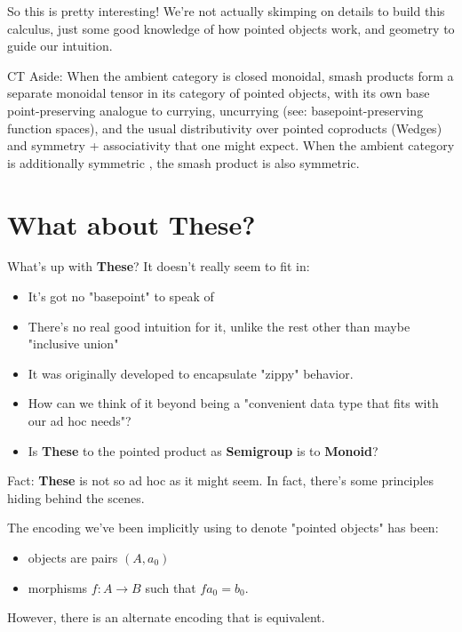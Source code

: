 \documentclass[tikz]{beamer}
\theoremstyle{definition}
\begin{document}
\frame
{
	So this is pretty interesting! We're not actually skimping on details to build this calculus, just some good knowledge of how pointed objects work, and geometry to guide our intuition.
}

\frame
{
	CT Aside: When the ambient category is closed monoidal, smash products form a separate monoidal tensor in its category of pointed objects, with its own base point-preserving analogue to currying, uncurrying (see: basepoint-preserving function spaces), and the usual distributivity over pointed coproducts (Wedges) and symmetry + associativity that one might expect. When the ambient category is additionally symmetric , the smash product is also symmetric.
	  
}


\section{What about These?}

\frame
{
	What's up with \textbf{These}? It doesn't really seem to fit in: 
	
	\begin{itemize}
		\item It's got no "basepoint" to speak of
		\item There's no real good intuition for it, unlike the rest other than maybe "inclusive union"
		\item It was originally developed to encapsulate "zippy" behavior.
		\item How can we think of it beyond being a "convenient data type that fits with our ad hoc needs"?
		\item Is \textbf{These} to the pointed product as \textbf{Semigroup} is to \textbf{Monoid}?
	\end{itemize}
}

\frame
{
	Fact: \textbf{These} is not so ad hoc as it might seem. In fact, there's some principles hiding behind the scenes.
}

\frame
{
	The encoding we've been implicitly using to denote "pointed objects" has been: 
	
	\begin{itemize}
		\item objects are pairs $(A, a_0)$
		\item morphisms $f : A \rightarrow B$ such that $f a_0 = b_0$. 
	\end{itemize}
	

However, there is an alternate encoding that is equivalent.
		
}
\end{document}
